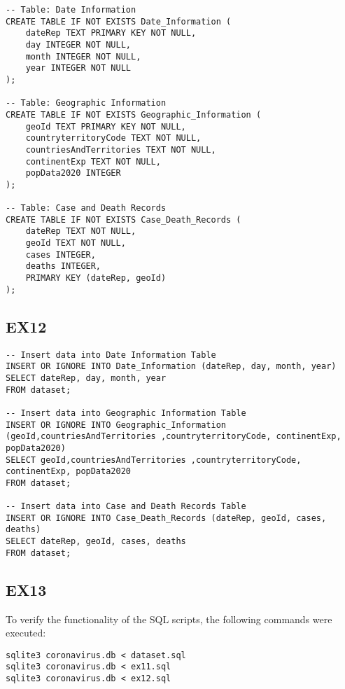 \documentclass{article}
\begin{document}
\begin{verbatim}
-- Table: Date Information
CREATE TABLE IF NOT EXISTS Date_Information (
    dateRep TEXT PRIMARY KEY NOT NULL,
    day INTEGER NOT NULL,
    month INTEGER NOT NULL,
    year INTEGER NOT NULL
);

-- Table: Geographic Information
CREATE TABLE IF NOT EXISTS Geographic_Information (
    geoId TEXT PRIMARY KEY NOT NULL,
    countryterritoryCode TEXT NOT NULL,
    countriesAndTerritories TEXT NOT NULL,
    continentExp TEXT NOT NULL,
    popData2020 INTEGER
);

-- Table: Case and Death Records
CREATE TABLE IF NOT EXISTS Case_Death_Records (
    dateRep TEXT NOT NULL,
    geoId TEXT NOT NULL,
    cases INTEGER,
    deaths INTEGER,
    PRIMARY KEY (dateRep, geoId)
);
\end{verbatim}

\subsection{EX12}

\begin{verbatim}
-- Insert data into Date Information Table
INSERT OR IGNORE INTO Date_Information (dateRep, day, month, year)
SELECT dateRep, day, month, year
FROM dataset;

-- Insert data into Geographic Information Table
INSERT OR IGNORE INTO Geographic_Information (geoId,countriesAndTerritories ,countryterritoryCode, continentExp, popData2020)
SELECT geoId,countriesAndTerritories ,countryterritoryCode, continentExp, popData2020
FROM dataset;

-- Insert data into Case and Death Records Table
INSERT OR IGNORE INTO Case_Death_Records (dateRep, geoId, cases, deaths)
SELECT dateRep, geoId, cases, deaths
FROM dataset;
\end{verbatim}
\subsection{EX13}

To verify the functionality of the SQL scripts, the following commands were executed:

\begin{verbatim}
sqlite3 coronavirus.db < dataset.sql
sqlite3 coronavirus.db < ex11.sql
sqlite3 coronavirus.db < ex12.sql
\end{verbatim}
\end{document}
